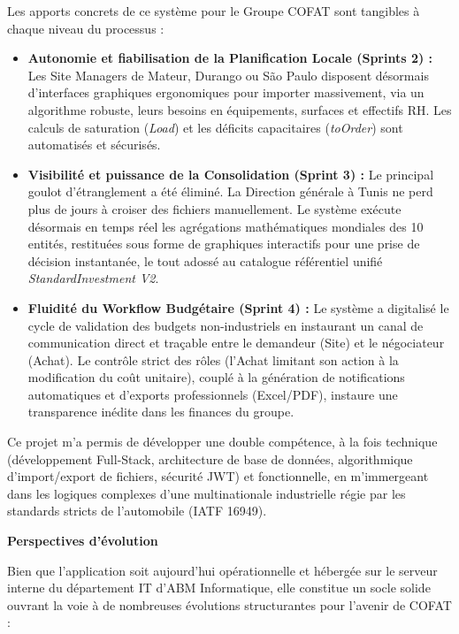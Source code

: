 Les apports concrets de ce système pour le Groupe COFAT sont tangibles à chaque niveau du processus :
\begin{itemize}
    \item \textbf{Autonomie et fiabilisation de la Planification Locale (Sprints 2) :} Les Site Managers de Mateur, Durango ou São Paulo disposent désormais d'interfaces graphiques ergonomiques pour importer massivement, via un algorithme robuste, leurs besoins en équipements, surfaces et effectifs RH. Les calculs de saturation (\textit{Load}) et les déficits capacitaires (\textit{toOrder}) sont automatisés et sécurisés.
    \item \textbf{Visibilité et puissance de la Consolidation (Sprint 3) :} Le principal goulot d'étranglement a été éliminé. La Direction générale à Tunis ne perd plus de jours à croiser des fichiers manuellement. Le système exécute désormais en temps réel les agrégations mathématiques mondiales des 10 entités, restituées sous forme de graphiques interactifs pour une prise de décision instantanée, le tout adossé au catalogue référentiel unifié \textit{StandardInvestment V2}.
    \item \textbf{Fluidité du Workflow Budgétaire (Sprint 4) :} Le système a digitalisé le cycle de validation des budgets non-industriels en instaurant un canal de communication direct et traçable entre le demandeur (Site) et le négociateur (Achat). Le contrôle strict des rôles (l'Achat limitant son action à la modification du coût unitaire), couplé à la génération de notifications automatiques et d'exports professionnels (Excel/PDF), instaure une transparence inédite dans les finances du groupe.
\end{itemize}

Ce projet m'a permis de développer une double compétence, à la fois technique (développement Full-Stack, architecture de base de données, algorithmique d'import/export de fichiers, sécurité JWT) et fonctionnelle, en m'immergeant dans les logiques complexes d'une multinationale industrielle régie par les standards stricts de l'automobile (IATF 16949).

\textbf{Perspectives d'évolution}

Bien que l'application soit aujourd'hui opérationnelle et hébergée sur le serveur interne du département IT d'ABM Informatique, elle constitue un socle solide ouvrant la voie à de nombreuses évolutions structurantes pour l'avenir de COFAT :

